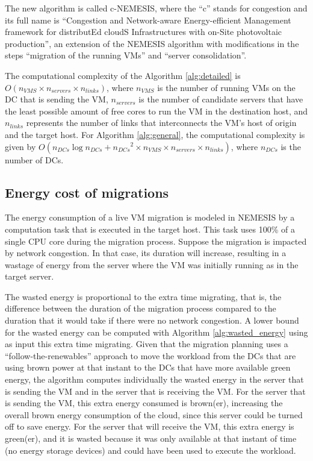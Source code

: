 The new algorithm is called c-NEMESIS, where the ``c'' stands for congestion and its full name is ``Congestion and Network-aware Energy-efficient Management framework for distributEd cloudS Infrastructures with on-Site photovoltaic production'', an extension of the NEMESIS algorithm with modifications in the steps ``migration of the running VMs'' and  ``server consolidation''.


The computational complexity of the Algorithm \ref{alg:detailed} is $O(n_{VMS} \times  n_{servers} \times n_{links}  )$, where $n_{VMS}$ is the number of running VMs on the DC that is sending the VM, $n_{servers}$ is the number of candidate servers that have the least possible amount of free cores to run the VM in the destination host, and $n_{links}$ represents the number of links that interconnects the VM's host of origin and the target host. For Algorithm \ref{alg:general}, the computational complexity is given by $O(n_{DCs}\log{}n_{DCs} + {n_{DCs}}^{2} \times n_{VMS} \times  n_{servers} \times n_{links})$, where $n_{DCs}$ is the number of DCs.


\subsection{Energy cost of migrations}\label{sec:energy_costs_mig}

The energy consumption of a live VM migration is modeled in NEMESIS by a computation task that is executed in the target host. This task uses 100\% of a single CPU core during the migration process. Suppose the migration is impacted by network congestion. In that case, its duration will increase, resulting in a wastage of energy from the server where the VM was initially running as in the target server.


The wasted energy is proportional to the extra time migrating, that is, the difference between the duration of the migration process compared to the duration that it would take if there were no network congestion. A lower bound for the wasted energy can be computed with Algorithm \ref{alg:wasted_energy} using as input this extra time migrating. Given that the migration planning uses a ``follow-the-renewables'' approach to move the workload from the DCs that are using brown power at that instant to the DCs that have more available green energy, the algorithm computes individually the wasted energy in the server that is sending the VM and in the server that is receiving the VM. For the server that is sending the VM, this extra energy consumed is brown(er), increasing the overall brown energy consumption of the cloud, since this server could be turned off to save energy. For the server that will receive the VM, this extra energy is green(er), and it is wasted because it was only available at that instant of time (no energy storage devices) and could have been used to execute the workload.


